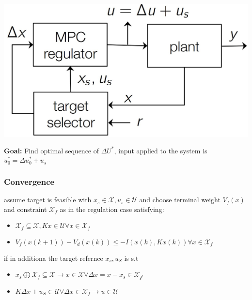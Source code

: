 \begin{minipage}{0.5\linewidth}
    \begin{center}
        \includegraphics[width = 0.99\linewidth]{MPC_summary/Images/Screenshot 2021-07-31 220518.jpg}
    \end{center}
\end{minipage}
\textbf{Goal:} Find optimal sequence of $\Delta U^*$, input applied to the system is $u_0^* = \Delta u_0^*+u_s$
\subsubsection{Convergence}
assume target is feasible with $x_s\in \mathcal{X}, u_s \in \mathcal{U}$ and choose terminal weight $V_f(x)$ and constraint $\mathcal{X}_f$ as in the regulation case satisfying:
\begin{itemize}
    \item $\mathcal{X}_f \subseteq \mathcal{X}, Kx \in \mathcal{U} \forall x \in \mathcal{X}_f$
    \item $V_f(x(k+1)) - V_d(x(k)) \leq -I(x(k),Kx(k)) \forall x \in \mathcal{X}_f$
\end{itemize}
if in additiona the target refernce $x_s, u_S$ is s.t 
\begin{itemize}
    \item $x_s \bigoplus \mathcal{X}_f \subseteq \mathcal{X} \rightarrow x \in \mathcal{X} \forall \Delta x = x -x_s \in \mathcal{X_f}$
    \item $K \Delta x + u_S \in \mathcal{U} \forall \Delta x \in \mathcal{X}_f \rightarrow u \in \mathcal{U}$
\end{itemize}
